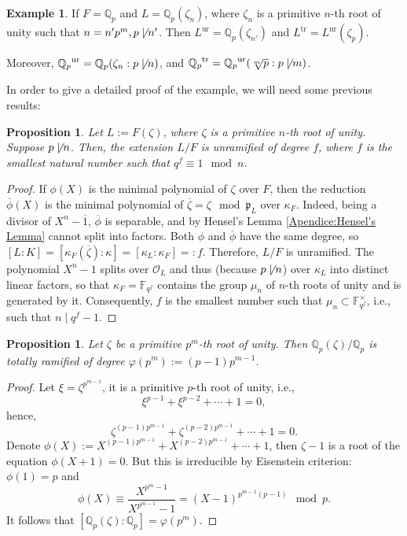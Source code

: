 \documentclass[12pt]{article}
\theoremstyle{plain}
\newtheorem{proposition}[theorem]{Proposition}
\theoremstyle{definition}
\newtheorem{example}[theorem]{Example}
\newenvironment{Example}{\colorlet{shadecolor}{Goldenrod!16} \begin{shaded} \begin{example}}{ \end{example} \end{shaded}}
\newcommand{\padics}{\mathbb{Q}_p}
\renewcommand{\bar}[1]{\overline{#1}}
\newcommand{\primo}[1]{\mathfrak{#1}}
\renewcommand{\O}{\mathcal{O}}
\newcommand{\ur}[1]{{#1}^{\operatorname{ur}}}
\newcommand{\tr}[1]{{#1}^{\operatorname{tr}}}
\begin{document}
\begin{Example}
If $F = \padics$ and $L = \padics (\zeta_n)$, where $\zeta_n$ is a primitive $n$-th root of unity such that $n = n' p^m, p \not \mid n'$. Then $\ur L = \padics (\zeta_{n'})$ and $\tr L = \ur L (\zeta_p)$.

Moreover, $\ur \padics = \padics (\zeta_n : p \not \mid n)$, and $\tr \padics = \ur \padics (\sqrt[m] p : p \not \mid m)$.
\end{Example}

In order to give a detailed proof of the example, we will need some previous results:

\begin{proposition}\label{proposition:an example - proposition 1}
Let $L := F (\zeta)$, where $\zeta$ is a primitive $n$-th root of unity. Suppose $p \not \mid n$. Then, the extension $L/F$ is unramified of degree $f$, where $f$ is the smallest natural number such that $q^f \equiv 1 \mod n$.
\end{proposition}
\begin{proof}
If $\phi (X)$ is the minimal polynomial of $\zeta$ over $F$, then the reduction $\bar \phi (X)$ is the minimal polynomial of $\bar \zeta = \zeta \mod \primo p_L$ over $\kappa_F$. Indeed, being a divisor of $X^n - \bar 1$, $\bar \phi$ is separable, and by Hensel's Lemma \ref{Apendice:Hensel's Lemma} cannot split into factors. Both $\phi$ and $\bar \phi$ have the same degree, so $[L : K] = [\kappa_F (\bar \zeta) : \kappa] = [\kappa_L : \kappa_F] =: f$. Therefore, $L/F$ is unramified. The polynomial $X^n - 1$ splits over $\O_L$ and thus (because $p \not \mid n$) over $\kappa_L$ into distinct linear factors, so that $\kappa_F = \mathbb{F}_{q^f}$ contains the group $\mu_n$ of $n$-th roots of unity and is generated by it. Consequently, $f$ is the smallest number such that $\mu_n \subset \mathbb F_{q^f}^\times$, i.e., such that $n \mid q^f - 1$.
\end{proof}

\begin{proposition}\label{proposition:an example - proposition 2}
Let $\zeta$ be a primitive $p^m$-th root of unity. Then $\padics (\zeta) /\padics $ is totally ramified of degree $\varphi (p^m) := (p-1)p^{m-1}$.
\end{proposition}
\begin{proof}
Let $\xi = \zeta^{p^{m-1}}$, it is a primitive $p$-th root of unity, i.e.,
\[
    \xi^{p-1} + \xi^{p-2} + \cdots + 1 = 0,
\]
hence,
\[
    \zeta^{(p-1)p^{m-1}} + \zeta^{(p-2)p^{m-1}} + \cdots + 1 = 0.
\]
Denote $\phi (X) := X^{(p-1)p^{m-1}} + X^{(p-2)p^{m-1}} + \cdots + 1$, then $\zeta - 1$ is a root of the equation $\phi (X + 1) = 0$. But this is irreducible by Eisenstein criterion: $\phi (1) = p$ and
\[
    \phi (X) \equiv \frac{X^{p^m-1}}{X^{p^{m-1}}-1} = (X-1)^{p^{m-1}(p-1)} \mod p.
\]
It follows that $[\padics (\zeta): \padics] = \varphi (p^m)$.
\end{proof}
\end{document}

